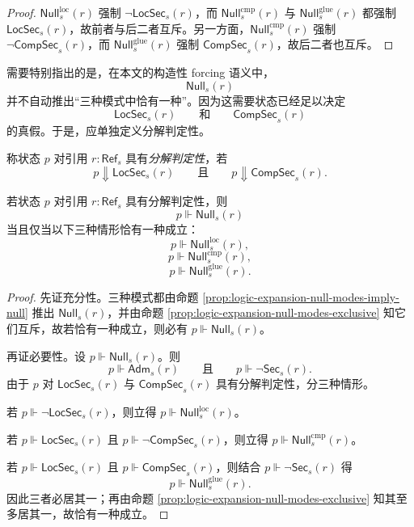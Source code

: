 \begin{proof}
\(\mathsf{Null}^{\mathrm{loc}}_s(r)\) 强制 \(\neg \mathsf{LocSec}_s(r)\)，而 \(\mathsf{Null}^{\mathrm{cmp}}_s(r)\) 与 \(\mathsf{Null}^{\mathrm{glue}}_s(r)\) 都强制 \(\mathsf{LocSec}_s(r)\)，故前者与后二者互斥。另一方面，\(\mathsf{Null}^{\mathrm{cmp}}_s(r)\) 强制 \(\neg \mathsf{CompSec}_s(r)\)，而 \(\mathsf{Null}^{\mathrm{glue}}_s(r)\) 强制 \(\mathsf{CompSec}_s(r)\)，故后二者也互斥。
\end{proof}

需要特别指出的是，在本文的构造性 forcing 语义中，
\[
\mathsf{Null}_s(r)
\]
并不自动推出“三种模式中恰有一种”。因为这需要状态已经足以决定
\[
\mathsf{LocSec}_s(r)
\qquad\text{和}\qquad
\mathsf{CompSec}_s(r)
\]
的真假。于是，应单独定义分解判定性。

\begin{definition}[分解判定性]\label{def:logic-expansion-null-decomposition-decidability}
称状态 \(p\) 对引用 \(r:\mathsf{Ref}_s\) 具有\emph{分解判定性}，若
\[
p\Downarrow \mathsf{LocSec}_s(r)
\qquad\text{且}\qquad
p\Downarrow \mathsf{CompSec}_s(r).
\]
\end{definition}

\begin{proposition}[在分解判定性下的三分解]\label{prop:logic-expansion-null-trichotomy}
若状态 \(p\) 对引用 \(r:\mathsf{Ref}_s\) 具有分解判定性，则
\[
p\Vdash \mathsf{Null}_s(r)
\]
当且仅当以下三种情形恰有一种成立：
\[
p\Vdash \mathsf{Null}^{\mathrm{loc}}_s(r),
\]
\[
p\Vdash \mathsf{Null}^{\mathrm{cmp}}_s(r),
\]
\[
p\Vdash \mathsf{Null}^{\mathrm{glue}}_s(r).
\]
\end{proposition}

\begin{proof}
先证充分性。三种模式都由命题 \ref{prop:logic-expansion-null-modes-imply-null} 推出 \(\mathsf{Null}_s(r)\)，并由命题 \ref{prop:logic-expansion-null-modes-exclusive} 知它们互斥，故若恰有一种成立，则必有 \(p\Vdash \mathsf{Null}_s(r)\)。
\par
再证必要性。设 \(p\Vdash \mathsf{Null}_s(r)\)。则
\[
p\Vdash \mathsf{Adm}_s(r)
\qquad\text{且}\qquad
p\Vdash \neg \mathsf{Sec}_s(r).
\]
由于 \(p\) 对 \(\mathsf{LocSec}_s(r)\) 与 \(\mathsf{CompSec}_s(r)\) 具有分解判定性，分三种情形。
\par
若 \(p\Vdash \neg \mathsf{LocSec}_s(r)\)，则立得 \(p\Vdash \mathsf{Null}^{\mathrm{loc}}_s(r)\)。
\par
若 \(p\Vdash \mathsf{LocSec}_s(r)\) 且 \(p\Vdash \neg \mathsf{CompSec}_s(r)\)，则立得 \(p\Vdash \mathsf{Null}^{\mathrm{cmp}}_s(r)\)。
\par
若 \(p\Vdash \mathsf{LocSec}_s(r)\) 且 \(p\Vdash \mathsf{CompSec}_s(r)\)，则结合 \(p\Vdash \neg \mathsf{Sec}_s(r)\) 得
\[
p\Vdash \mathsf{Null}^{\mathrm{glue}}_s(r).
\]
因此三者必居其一；再由命题 \ref{prop:logic-expansion-null-modes-exclusive} 知其至多居其一，故恰有一种成立。
\end{proof}

